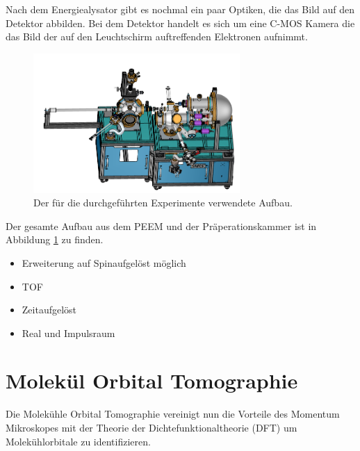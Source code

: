         Nach dem Energiealysator gibt es nochmal ein paar Optiken, die das Bild auf den Detektor abbilden.
        Bei dem Detektor handelt es sich um eine C-MOS Kamera die das Bild der auf den Leuchtschirm auftreffenden Elektronen aufnimmt.
        



        \begin{figure}
            \centering
            \includegraphics[width=0.7\textwidth]{./content/MM.png}
            \caption{Der für die durchgeführten Experimente verwendete Aufbau.}
            \label{fig:aufbau}
        \end{figure}
        Der gesamte Aufbau aus dem PEEM und der Präperationskammer ist in Abbildung \ref{fig:aufbau} zu finden.

        \begin{itemize}
            \item Erweiterung auf Spinaufgelöst möglich
            \item TOF
            \item Zeitaufgelöst
            \item Real und Impulsraum
        \end{itemize}

    \section{Molekül Orbital Tomographie}
        Die Molekühle Orbital Tomographie vereinigt nun die Vorteile des Momentum Mikroskopes mit der Theorie der Dichtefunktionaltheorie (DFT) um Molekühlorbitale zu identifizieren.


